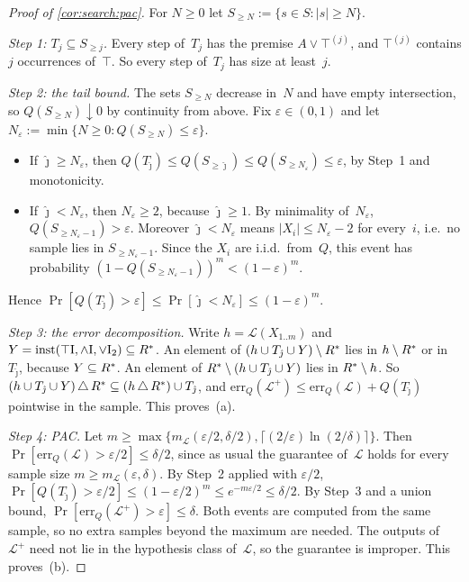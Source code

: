 \begin{proof}[Proof of \cref{cor:search:pac}]
For $N\ge0$ let $S_{\ge N}:=\{s\in S:|s|\ge N\}$.

\emph{Step 1: $T_j\subseteq S_{\ge j}$.} Every step of~$T_j$ has the premise $A\vee\top^{(j)}$, and $\top^{(j)}$ contains $j$ occurrences of~$\top$. So every step of~$T_j$ has size at least~$j$.

\emph{Step 2: the tail bound.} The sets $S_{\ge N}$ decrease in~$N$ and have empty intersection, so $Q(S_{\ge N})\downarrow0$ by continuity from above. Fix $\varepsilon\in(0,1)$ and let $N_\varepsilon:=\min\{N\ge0:Q(S_{\ge N})\le\varepsilon\}$.
\begin{itemize}
\item If $\hat\jmath\ge N_\varepsilon$, then $Q(T_{\hat\jmath})\le Q(S_{\ge\hat\jmath})\le Q(S_{\ge N_\varepsilon})\le\varepsilon$, by Step~1 and monotonicity.
\item If $\hat\jmath<N_\varepsilon$, then $N_\varepsilon\ge2$, because $\hat\jmath\ge1$. By minimality of~$N_\varepsilon$, $Q(S_{\ge N_\varepsilon-1})>\varepsilon$. Moreover $\hat\jmath<N_\varepsilon$ means $|X_i|\le N_\varepsilon-2$ for every~$i$, i.e.\ no sample lies in $S_{\ge N_\varepsilon-1}$. Since the $X_i$ are i.i.d.\ from~$Q$, this event has probability $(1-Q(S_{\ge N_\varepsilon-1}))^m<(1-\varepsilon)^m$.
\end{itemize}
Hence $\Pr[Q(T_{\hat\jmath})>\varepsilon]\le\Pr[\hat\jmath<N_\varepsilon]\le(1-\varepsilon)^m$.

\emph{Step 3: the error decomposition.} Write $h=\mathcal L(X_{1..m})$ and $Y=\mathrm{inst}(\top\mathrm{I},\wedge\mathrm{I},\vee\mathrm{I}_2)\subseteq R^{*}$. An element of $(h\cup T_{\hat\jmath}\cup Y)\setminus R^{*}$ lies in $h\setminus R^{*}$ or in~$T_{\hat\jmath}$, because $Y\subseteq R^{*}$. An element of $R^{*}\setminus(h\cup T_{\hat\jmath}\cup Y)$ lies in $R^{*}\setminus h$. So $(h\cup T_{\hat\jmath}\cup Y)\,\triangle\,R^{*}\subseteq(h\,\triangle\,R^{*})\cup T_{\hat\jmath}$, and $\mathrm{err}_Q(\mathcal L^+)\le\mathrm{err}_Q(\mathcal L)+Q(T_{\hat\jmath})$ pointwise in the sample. This proves~(a).

\emph{Step 4: PAC.} Let $m\ge\max\{m_{\mathcal L}(\varepsilon/2,\delta/2),\lceil(2/\varepsilon)\ln(2/\delta)\rceil\}$. Then $\Pr[\mathrm{err}_Q(\mathcal L)>\varepsilon/2]\le\delta/2$, since as usual the guarantee of~$\mathcal L$ holds for every sample size $m\ge m_{\mathcal L}(\varepsilon,\delta)$. By Step~2 applied with $\varepsilon/2$, $\Pr[Q(T_{\hat\jmath})>\varepsilon/2]\le(1-\varepsilon/2)^m\le e^{-m\varepsilon/2}\le\delta/2$. By Step~3 and a union bound, $\Pr[\mathrm{err}_Q(\mathcal L^+)>\varepsilon]\le\delta$. Both events are computed from the same sample, so no extra samples beyond the maximum are needed. The outputs of~$\mathcal L^+$ need not lie in the hypothesis class of~$\mathcal L$, so the guarantee is improper. This proves~(b).


\end{proof}
